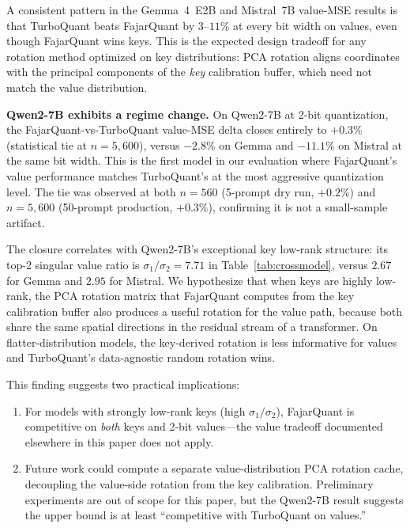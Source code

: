 \documentclass[10pt,twocolumn]{article}
\begin{document}
A consistent pattern in the Gemma~4~E2B and Mistral~7B value-MSE
results is that TurboQuant beats FajarQuant by $3$--$11\%$ at every
bit width on values, even though FajarQuant wins keys. This is the
expected design tradeoff for any rotation method optimized on key
distributions: PCA rotation aligns coordinates with the principal
components of the \emph{key} calibration buffer, which need not match
the value distribution.

\textbf{Qwen2-7B exhibits a regime change.} On Qwen2-7B at 2-bit
quantization, the FajarQuant-vs-TurboQuant value-MSE delta closes
entirely to $+0.3\%$ (statistical tie at $n{=}5{,}600$), versus
$-2.8\%$ on Gemma and $-11.1\%$ on Mistral at the same bit width.
This is the first model in our evaluation where FajarQuant's value
performance matches TurboQuant's at the most aggressive quantization
level. The tie was observed at both $n{=}560$ (5-prompt dry run,
$+0.2\%$) and $n{=}5{,}600$ (50-prompt production, $+0.3\%$),
confirming it is not a small-sample artifact.

The closure correlates with Qwen2-7B's exceptional key low-rank
structure: its top-2 singular value ratio is $\sigma_1/\sigma_2 = 7.71$
in Table~\ref{tab:crossmodel}, versus $2.67$ for Gemma and $2.95$ for
Mistral. We hypothesize that when keys are highly low-rank, the PCA
rotation matrix that FajarQuant computes from the key calibration
buffer also produces a useful rotation for the value path, because
both share the same spatial directions in the residual stream of a
transformer. On flatter-distribution models, the key-derived rotation
is less informative for values and TurboQuant's data-agnostic random
rotation wins.

This finding suggests two practical implications:
\begin{enumerate}[nosep]
\item For models with strongly low-rank keys (high
$\sigma_1/\sigma_2$), FajarQuant is competitive on \emph{both} keys
and 2-bit values---the value tradeoff documented elsewhere in this
paper does not apply.
\item Future work could compute a separate value-distribution PCA
rotation cache, decoupling the value-side rotation from the key
calibration. Preliminary experiments are out of scope for this paper,
but the Qwen2-7B result suggests the upper bound is at least
``competitive with TurboQuant on values.''
\end{enumerate}

\end{document}
